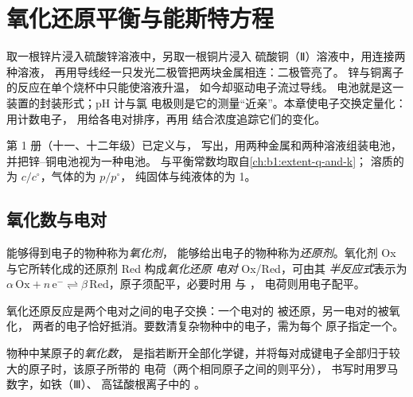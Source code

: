 \chapter{氧化还原平衡与能斯特方程}\label{ch:b1:nernst}

取一根锌片浸入硫酸锌溶液中，另取一根铜片浸入
硫酸铜（Ⅱ）溶液中，用连接两种溶液，
再用导线经一只发光二极管把两块金属相连：二极管亮了。
锌与铜离子的反应在单个烧杯中只能使溶液升温，
如今却驱动电子流过导线。
电池就是这一装置的封装形式；pH 计与氯
电极则是它的测量“近亲”。本章使电子交换定量化：
用计数电子，
用给各电对排序，再用
结合浓度追踪它们的变化。

\begin{recall}
第 1 册（十一、十二年级）已定义与，
写出，用两种金属和两种溶液组装电池，
并把锌–铜电池视为一种电池。
与平衡常数均取自\cref{ch:b1:extent-q-and-k}；
溶质的为 $c/c^\circ$，气体的为 $p/p^\circ$，
纯固体与纯液体的为 1。
\end{recall}

\section{氧化数与电对}

\begin{definition}\label{def:b1:nernst:couple}
能够得到电子的物种称为\emph{氧化剂}，
能够给出电子的物种称为\emph{还原剂}。氧化剂 Ox 与它所转化成的还原剂 Red
构成\emph{氧化还原
电对} Ox/Red，可由其
\emph{半反应式}表示为
$\alpha\,\mathrm{Ox} + n\,\mathrm{e^-} \rightleftharpoons
\beta\,\mathrm{Red}$，原子须配平，必要时用  与 ，
电荷则用电子配平。
\end{definition}

氧化还原反应是两个电对之间的电子交换：一个电对的
被还原，另一电对的被氧化，
两者的电子恰好抵消。要数清复杂物种中的电子，需为每个
原子指定一个。

\begin{definition}[氧化数]\label{def:b1:nernst:oxidation-number}
物种中某原子的\emph{氧化数}，
是指若断开全部化学键，并将每对成键电子全部归于较大的原子时，该原子所带的
电荷（两个相同原子之间的则平分），
书写时用罗马数字，如铁（Ⅲ）、
高锰酸根离子中的 。
\end{definition}


